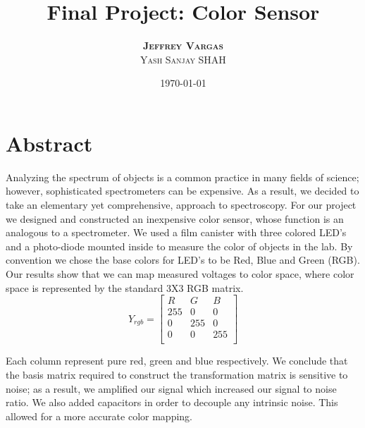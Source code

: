 \documentclass[paper=letter, fontsize=12pt]{article}
\title{\vspace{-15mm}\fontsize{24pt}{10pt}\selectfont\textbf{Final Project: Color Sensor}} %
\author{
\large
{\textsc{\textbf{Jeffrey Vargas} }}\\[2mm]
{\textsc{Yash Sanjay SHAH }}\\[2mm]}
\date{\today}
\begin{document}
\maketitle %
\thispagestyle{fancy} %



\section*{Abstract}

Analyzing the spectrum of objects is a common practice in many fields of science; however, sophisticated spectrometers can be expensive. As a result, we decided to take an elementary yet comprehensive, approach to spectroscopy. For our project we designed and constructed an inexpensive color sensor, whose function is an analogous to a spectrometer. We used a film canister with three colored LED's and a photo-diode mounted inside to measure the color of objects in the lab. By convention we chose the base colors for LED's to be Red, Blue and Green (RGB). Our results show that we can map measured voltages to color space, where color space is represented by the  standard 3X3 RGB matrix. 
\[
Y_{rgb} = 
\begin{bmatrix}
R & G & B\\ 
255 & 0 & 0\\ 
0 & 255 & 0\\ 
0 & 0 & 255\\ 
\end{bmatrix}
\]

Each column represent pure red, green and blue respectively.  We conclude that the basis matrix required to construct the transformation matrix is sensitive to noise; as a result, we amplified our signal which increased our signal to noise ratio. We also added capacitors in order to decouple any intrinsic noise. This allowed for a more accurate  color mapping. \\
  


\end{document}
